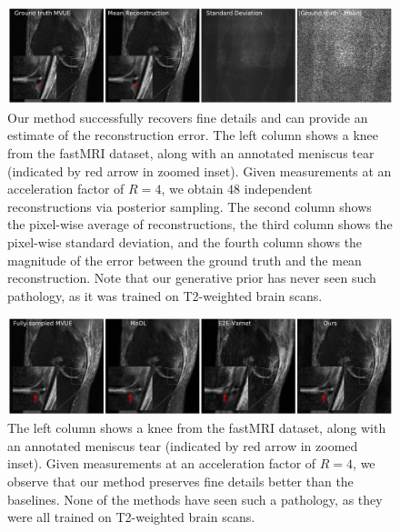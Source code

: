 \documentclass{article}
\begin{document}
\begin{figure}
    \centering
    \includegraphics[width=\columnwidth]{uncertainty_case_1_annotated-comp.pdf}
    \caption{\small Our method successfully recovers fine details and can provide an estimate of the reconstruction error. The left column shows a knee from the fastMRI dataset, along with an annotated meniscus tear (indicated by red arrow in zoomed inset). Given measurements at an acceleration factor of $R=4$, we obtain $48$ independent reconstructions via posterior sampling. The second column shows the pixel-wise average of reconstructions, the third column shows the pixel-wise standard deviation, and the fourth column shows the magnitude of the error between the ground truth and the mean reconstruction. Note that our generative prior has never seen such pathology, as it was trained on T2-weighted brain scans.}
    \label{fig:uncertainty-app}
\end{figure}

\begin{figure}[t]
\begin{center}
  \includegraphics[width=\columnwidth]{meniscus_tear_case_1_annotated-comp.pdf}
\end{center}
\caption{\small The left column shows a knee from the fastMRI dataset, along with an annotated meniscus tear (indicated by red arrow in zoomed inset). Given measurements at an acceleration factor of $R=4$, we observe that our method preserves fine details better than the baselines. None of the methods have seen such a pathology, as they were all trained on T2-weighted brain scans.}
\label{fig:tear-baslines-1}
\end{figure}
\end{document}
